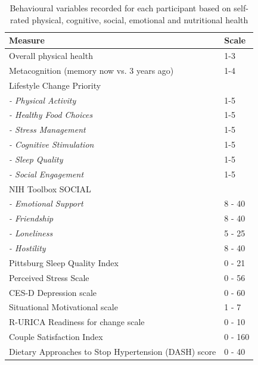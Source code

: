 \begin{table}[h]
\centering
\caption{Behavioural variables recorded for each participant based on self-rated physical, cognitive, social, emotional and nutritional health}
\label{tbl: behavioural-variables}
\begin{tabular}{@{}ll@{}}
\toprule
Measure & Scale \\ \midrule
Overall physical health & 1-3 \\
Metacognition (memory now vs. 3 years ago) & 1-4 \\
Lifestyle Change Priority & \\
\textit{- Physical Activity} & 1-5 \\
\textit{- Healthy Food Choices} & 1-5 \\
\textit{- Stress Management} & 1-5 \\
\textit{- Cognitive Stimulation} & 1-5 \\
\textit{- Sleep Quality} & 1-5 \\
\textit{- Social Engagement} & 1-5 \\
NIH Toolbox SOCIAL &  \\
\textit{- Emotional Support} & 8 - 40 \\
\textit{- Friendship} & 8 - 40 \\
\textit{- Loneliness} & 5 - 25 \\
\textit{- Hostility} & 8 - 40 \\
Pittsburg Sleep Quality Index \cite{Buysse1989} & 0 - 21 \\
Perceived Stress Scale \cite{Cohen1983} & 0 - 56 \\
CES-D Depression scale \cite{Radloff1977} & 0 - 60 \\
Situational Motivational scale \cite{Guay2000} & 1 - 7 \\
R-URICA Readiness for change scale \cite{McConnaughy1983} & 0 - 10 \\
Couple Satisfaction Index \cite{Funk2007} & 0 - 160 \\
Dietary Approaches to Stop Hypertension (DASH) score \cite{Block1990} & 0 - 40 \\ \bottomrule
\end{tabular}
\end{table}

